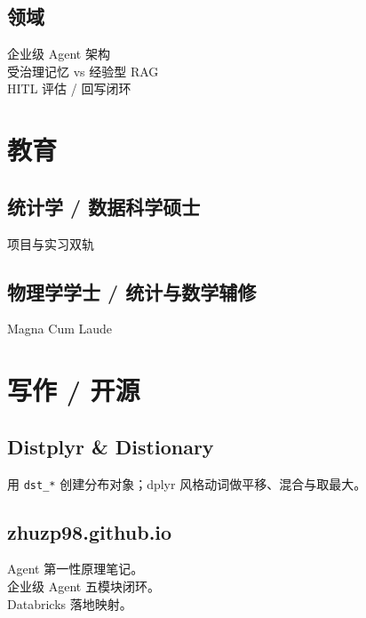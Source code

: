 \documentclass[letterpaper]{deedy-resume}
\renewcommand{\descript}[1]{%
\color{subheadings}\raggedright\fontsize{11pt}{13pt}\selectfont {#1 \\}\normalfont}
\renewcommand{\location}[1]{%
\color{headings}\raggedright\fontsize{10pt}{12pt}\selectfont {#1\\}\normalfont}
\begin{document}
\begin{minipage}[t]{0.33\textwidth}
\subsection{领域}
企业级 Agent 架构 \\
受治理记忆 vs 经验型 RAG \\
HITL 评估 / 回写闭环

\sectionspace

\section{教育}
\vspace{1mm}

\subsection{统计学 / 数据科学硕士}
\descript{英属哥伦比亚大学}
\location{2022年5月 $|$ 温哥华, BC}
项目与实习双轨

\sectionspace

\subsection{物理学学士 / 统计与数学辅修}
\descript{俄亥俄州立大学}
\location{2020年5月 $|$ 哥伦布, OH}
Magna Cum Laude

\sectionspace

\section{写作 / 开源}
\vspace{1mm}
\subsection{Distplyr \& Distionary}
\descript{R / probaverse}
用 \texttt{dst\_*} 创建分布对象；dplyr 风格动词做平移、混合与取最大。

\sectionspace

\subsection{zhuzp98.github.io}
Agent 第一性原理笔记。 \\
企业级 Agent 五模块闭环。 \\
Databricks 落地映射。

\end{minipage}
\hfill
\end{document}

